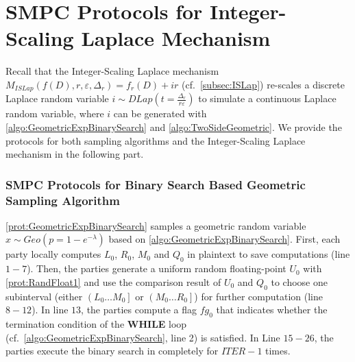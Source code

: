
                  \section{SMPC Protocols for Integer-Scaling Laplace Mechanism}
                  \label{sec:MPCProtocolsforInteger-ScalingLaplaceMechanism}
                  Recall that the Integer-Scaling Laplace mechanism $M_{ISLap}\left(f\left(D\right),r,\varepsilon,\Delta _r\right)=f_r\left(D\right) +ir$ (cf.~\autoref{subsec:ISLap}) re-scales a discrete Laplace random variable $i \sim DLap\left(t=\frac{\Delta_r}{r\varepsilon}\right) $ to simulate a continuous Laplace random variable, where $i$ can be generated with \autoref{algo:GeometricExpBinarySearch} and \autoref{algo:TwoSideGeometric}. We provide the \smpc protocols for both sampling algorithms and the Integer-Scaling Laplace mechanism in the following part.

                  \subsubsection{SMPC Protocols for Binary Search Based Geometric Sampling Algorithm}
                  \label{subsec::MPCProtocolsforBinarySearchBasedGeometricSamplingAlgorithm}
                  \autoref{prot:GeometricExpBinarySearch} samples a geometric random variable $x\sim Geo\left(p=1-e^{-\lambda}\right) $ based on \autoref{algo:GeometricExpBinarySearch}.
                  First, each party locally computes $L_0$, $R_0$, $M_0$ and $Q_0$ in plaintext to save \smpc computations (line $1-7$).
                  Then, the parties generate a uniform random floating-point $U_0$ with \autoref{prot:RandFloat1} and use the comparison result of $U_0$ and $Q_0$ to choose one subinterval (either $\left(L_0\ldots M_0\right] $ or $\left(M_0\ldots R_0\right] $) for further computation (line $8-12$).
      In line $13$, the parties compute a flag $fg_0$ that indicates whether the termination condition of the \textbf{WHILE} loop (cf.~\autoref{algo:GeometricExpBinarySearch}, line 2) is satisfied.
      In Line $15-26$, the parties execute the binary search in \smpc completely for $ITER-1$ times.

